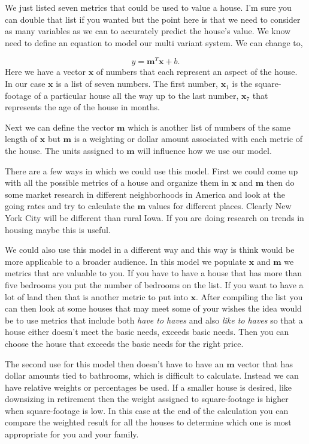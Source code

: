 We just listed seven metrics that could be used to value a house. I'm sure you can double that list if you wanted but the point here is that we need to consider as many variables as we can to accurately predict the house's value. We know need to define an equation to model our multi variant system. We can change  to,

\begin{equation}
y = \mathbf{m}^T\mathbf{x} + b.
\end{equation}
\noindent
Here we have a vector $\mathbf{x}$ of numbers that each represent an aspect of the house. In our case $\mathbf{x}$ is a list of seven numbers. The first number, $\mathbf{x}_1$ is the square-footage of a particular house all the way up to the last number, $\mathbf{x}_7$ that represents the age of the house in months. 

Next we can define the vector $\mathbf{m}$ which is another list of numbers of the same length of $\mathbf{x}$ but $\mathbf{m}$ is a weighting or dollar amount associated with each metric of the house. The units assigned to $\mathbf{m}$ will influence how we use our model.

There are a few ways in which we could use this model. First we could come up with all the possible metrics of a house and organize them in $\mathbf{x}$ and $\mathbf{m}$ then do some market research in different neighborhoods in America and look at the going rates and try to calculate the $\mathbf{m}$ values for different places. Clearly New York City will be different than rural Iowa. If you are doing research on trends in housing maybe this is useful. 

We could also use this model in a different way and this way is think would be more applicable to a broader audience. In this model we populate $\mathbf{x}$ and $\mathbf{m}$ we metrics that are valuable to you. If you have to have a house that has more than five bedrooms you put the number of bedrooms on the list. If you want to have a lot of land then that is another metric to put into $\mathbf{x}$. After compiling the list you can then look at some houses that may meet some of your wishes the idea would be to use metrics that include both \emph{have to haves} and also \emph{like to haves} so that a house either doesn't meet the basic needs, exceeds basic needs. Then you can choose the house that exceeds the basic needs for the right price. 

The second use for this model then doesn't have to have an $\mathbf{m}$ vector that has dollar amounts tied to bathrooms, which is difficult to calculate. Instead we can have relative weights or percentages be used. If a smaller house is desired, like downsizing in retirement then the weight assigned to square-footage is higher when square-footage is low. In this case at the end of the calculation you can compare the weighted result for all the houses to determine which one is most appropriate for you and your family. 

